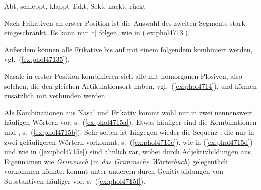 \begin{exe}
  \ex\label{ex:phol4712}
  \begin{xlist}
  	\ex Abt, schleppt, klappt
  	\ex Takt, Sekt, nackt, rückt
  \end{xlist}
\end{exe}

Nach Frikativen an erster Position ist die Auswahl des zweiten Segments stark eingeschränkt.
Es kann nur [t] folgen, wie in (\ref{ex:phol4713}).

\begin{exe}
\end{exe}

Außerdem können alle Frikative bis auf \textipa{[s]} mit einem folgendem \textipa{[s]} kombiniert werden, vgl.\ (\ref{ex:phol47135}).

\begin{exe}
\end{exe}

Nasale in erster Position kombinieren sich alle mit homorganen Plosiven, also solchen, die den gleichen Artikulationsort haben, vgl.\ (\ref{ex:phol4714}).
\textipa{[m]} und \textipa{[N]} können zusätzlich mit \textipa{[t]} verbunden werden.

\begin{exe}
  \ex\label{ex:phol4714}
  \begin{xlist}
  \end{xlist}
\end{exe}

Als Kombinationen aus Nasal und Frikativ kommt \textipa{[n\c{c}]} wohl nur in zwei nennenswert häufigen Wörtern vor, s.\ (\ref{ex:phol4715a}).
Etwas häufiger sind die Kombinationen \textipa{[nf]} und \textipa{[ns]}, s.\ (\ref{ex:phol4715b}).
Sehr selten ist hingegen wieder die Sequenz \textipa{[nS]}, die nur in zwei geläufigeren Wörtern vorkommt, s.\ (\ref{ex:phol4715c}).
\textipa{[ms]} wie in (\ref{ex:phol4715d}) und \textipa{[mS]} wie in (\ref{ex:phol4715e}) sind ähnlich rar, wobei \textipa{[mS]} durch Adjektivbildungen aus Eigennamen wie \textit{Grimmsch} (in \textit{das Grimmsche Wörterbuch}) gelegentlich vorkommen könnte.
\textipa{[Ns]} kommt unter anderem durch Genitivbildungen von Substantiven häufiger vor, s.\ (\ref{ex:phol4715f}).

\begin{exe}
  \ex\label{ex:phol4715}
  \begin{xlist}
  \end{xlist}
\end{exe}

